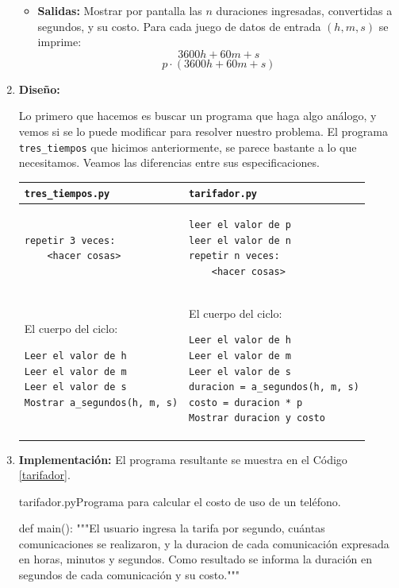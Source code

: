 \begin{solucion}
\begin{enumerate}
\begin{itemize}
\item {\bf Salidas: } Mostrar por pantalla las $n$ duraciones ingresadas, convertidas a segundos,
y su costo.
Para cada juego de datos de entrada $(h, m, s)$ se imprime:
$$ 3600 h + 60 m + s $$
$$ p \cdot (3600 h + 60 m + s) $$
\end{itemize}

\item {\bf Diseño:}

Lo primero que hacemos es buscar un programa que haga algo análogo, y vemos si se
lo puede modificar para resolver nuestro problema.  El programa
\lstinline+tres_tiempos+ que hicimos anteriormente,  se parece bastante a lo
que necesitamos. Veamos las diferencias entre sus especificaciones.

\begin{center}
\begin{tabular}{p{} p{}}
\lstinline!tres_tiempos.py! & \lstinline!tarifador.py!
\\
\hline
\begin{verbatim}
repetir 3 veces:
    <hacer cosas>
\end{verbatim}
&
\begin{verbatim}
leer el valor de p
leer el valor de n
repetir n veces:
    <hacer cosas>
\end{verbatim}
\\
\hline
El cuerpo del ciclo:
{\footnotesize
\begin{verbatim}
Leer el valor de h
Leer el valor de m
Leer el valor de s
Mostrar a_segundos(h, m, s)
\end{verbatim}
} &
El cuerpo del ciclo:
{\footnotesize
\begin{verbatim}
Leer el valor de h
Leer el valor de m
Leer el valor de s
duracion = a_segundos(h, m, s)
costo = duracion * p
Mostrar duracion y costo
\end{verbatim}
} \\
\end{tabular}
\end{center}

\item {\bf Implementación:} El programa resultante se muestra en el Código
    \ref{tarifador}.

\begin{codigo}{\label{tarifador} tarifador.py}{Programa para calcular el costo
    de uso de un teléfono.}
\begin{codigo-python}
def main():
    """El usuario ingresa la tarifa por segundo, cuántas
       comunicaciones se realizaron, y la duracion de cada
       comunicación expresada en horas, minutos y segundos. Como
       resultado se informa la duración en segundos de cada
       comunicación y su costo."""


\end{codigo-python}
\end{codigo}
\end{enumerate}
\end{solucion}
